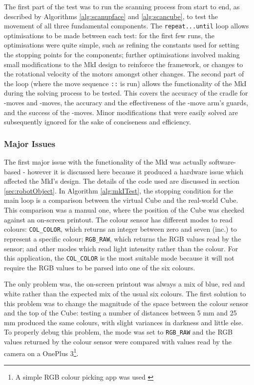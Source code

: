 \documentclass{report}
\newcommand{\movesequence}[1]{\uppercase{\texttt{:\formatmoves{#1}:}}}
\newcommand{\move}[1]{\uppercase{\texttt{\formatmovesnospace{#1}}}-move}
\begin{document}
	The first part of the test was to run the scanning process from start to end, as described by Algorithms \ref{alg:scanupface} and \ref{alg:scancube}, to test the movement of all three fundamental components. The \lstinline|repeat...until| loop allows optimisations to be made between each test: for the first few runs, the optimisations were quite simple, such as refining the constants used for setting the stopping points for the components; further optimisations involved making small modifications to the MkI design to reinforce the framework, or changes to the rotational velocity of the motors amongst other changes. The second part of the loop (where the move sequence \movesequence{y.y'x.y'd'd2d'x} is run) allows the functionality of the MkI during the solving process to be tested. This covers the accuracy of the cradle for \move{d}s and \move{y}s, the accuracy and the effectiveness of the \move{x} arm's guards, and the success of the \move{x}s. Minor modifications that were easily solved are subsequently ignored for the sake of conciseness and efficiency.
	
	\subsubsection{Major Issues} \label{sec:mkIMajorIssues}
	
	The first major issue with the functionality of the MkI was actually software-based - however it is discussed here because it produced a hardware issue which affected the MkI's design. The details of the code used are discussed in section \ref{sec:robotObject}. In Algorithm \ref{alg:mkITest}, the stopping condition for the main loop is a comparison between the virtual Cube and the real-world Cube. This comparison was a manual one, where the position of the Cube was checked against an on-screen printout. The colour sensor has different modes to read colours: \lstinline|COL_COLOR|, which returns an integer between zero and seven (inc.) to represent a specific colour; \lstinline|RGB_RAW|, which returns the RGB values read by the sensor; and other modes which read light intensity rather than the colour. For this application, the \lstinline|COL_COLOR| is the most suitable mode because it will not require the RGB values to be parsed into one of the six colours.
	
	The only problem was, the on-screen printout was always a mix of blue, red and white rather than the expected mix of the usual six colours. The first solution to this problem was to change the magnitude of the space between the colour sensor and the top of the Cube: testing a number of distances between 5 \si{\milli\metre} and 25 \si{\milli\metre} produced the same colours, with slight variances in darkness and little else. To properly debug this problem, the mode was set to \lstinline|RGB_RAW| and the RGB values returned by the colour sensor were compared with values read by the camera on a OnePlus 3\footnote{A simple RGB colour picking app was used \cite{RangoApps2015}}.
	
\end{document}
